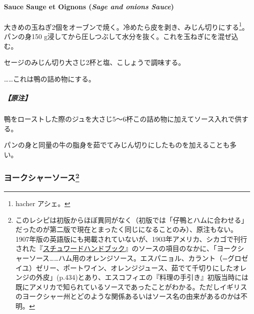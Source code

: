 \begin{recette}
\hypertarget{sage-and-onions-sauce}{%
\paragraph{\texorpdfstring{Sauce Sauge et Oignons (\emph{Sage and onions
Sauce})}{Sauce Sauge et Oignons (Sage and onions Sauce)}}\label{sage-and-onions-sauce}}


大きめの玉ねぎ2個をオーブンで焼く。冷めたら皮を剥き、みじん切りにする\footnote{hacher
  アシェ。}。パンの身150
g浸してから圧しつぶして水分を抜く。これを玉ねぎにを混ぜ込む。

セージのみじん切り大さじ2杯と塩、こしょうで調味する。

\ldots{}\ldots{}これは鴨の詰め物にする。

\hypertarget{ux539fux6ce8-3}{%
\subparagraph{【原注】}\label{ux539fux6ce8-3}}

鴨をローストした際のジュを大さじ5〜6杯この詰め物に加えてソース入れで供する。

パンの身と同量の牛の脂身を茹でてみじん切りにしたものを加えることも多い。

\maeaki

\hypertarget{ux30e8ux30fcux30afux30b7ux30e3ux30fcux30bdux30fcux30b953}{%
\subsubsection[ヨークシャーソース]{\texorpdfstring{ヨークシャーソース\footnote{このレシピは初版からほぼ異同がなく（初版では「仔鴨とハムに合わせる」だったのが第二版で現在とまったく同じになることのみ）、原注もない。1907年版の英語版にも掲載されていないが、1903年アメリカ、シカゴで刊行された『\href{https://archive.org/details/stewardshandbook00whitiala}{スチュワードハンドブック}』のソースの項目のなかに、「ヨークシャーソース\ldots{}\ldots{}ハム用のオレンジソース。エスパニョル、カラント（=グロゼイユ）ゼリー、ポートワイン、オレンジジュース、茹でて千切りにしたオレンジの外皮」(p.434)とあり、エスコフィエの『料理の手引き』初版当時には既にアメリカで知られているソースであったことがわかる。ただしイギリスのヨークシャー州とどのような関係あるいはソース名の由来があるのかは不明。}}{ヨークシャーソース}}\label{ux30e8ux30fcux30afux30b7ux30e3ux30fcux30bdux30fcux30b953}}


\end{recette}
